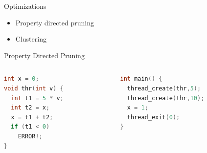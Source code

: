 \documentclass[t]{beamer}
\begin{document}
\begin{frame}{Optimizations}
  \begin{itemize}[<+->]
    \item Property directed pruning
    \item Clustering
  \end{itemize}
\end{frame}

\begin{frame}[fragile]{Property Directed Pruning}

  \begin{columns}[c]
    \begin{column}{0.5\textwidth}
    \begin{lstlisting}[language=C, name=motiv3]
int x = 0;
void thr(int v) {
  int t1 = 5 * v;
  int t2 = x;
  x = t1 + t2;
  if (t1 < 0) 
    ERROR!;
}
    \end{lstlisting}
    \end{column}
    \begin{column}{0.5\textwidth}
      \begin{lstlisting}[language=C, name=motiv3]
int main() {
  thread_create(thr,5);
  thread_create(thr,10);
  x = 1;
  thread_exit(0);
}


\end{lstlisting}
\end{column}
\end{columns}
\end{frame}
\end{document}

